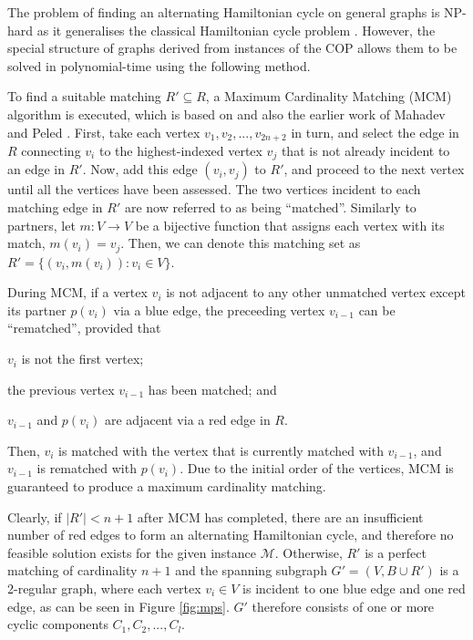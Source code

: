 \documentclass[runningheads]{llncs}
\begin{document}
The problem of finding an alternating Hamiltonian cycle on general graphs is NP-hard as it generalises the classical Hamiltonian cycle problem \cite{haggkvist1977}. However, the special structure of graphs derived from instances of the COP allows them to be solved in polynomial-time using the following method.

To find a suitable matching $R' \subseteq R$, a Maximum Cardinality Matching (MCM) algorithm is executed, which is based on \cite{becker2010} and also the earlier work of Mahadev and Peled \cite{mahadev1994}. First, take each vertex $v_1, v_2,..., v_{2n+2}$ in turn, and select the edge in $R$ connecting $v_i$ to the highest-indexed vertex $v_j$ that is not already incident to an edge in $R'$. Now, add this edge $(v_i, v_j)$ to $R'$, and proceed to the next vertex until all the vertices have been assessed. The two vertices incident to each matching edge in $R'$ are now referred to as being ``matched''. Similarly to partners, let $m : V \to V$ be a bijective function that assigns each vertex with its match, $m(v_i) = v_j$. Then, we can denote this matching set as $R' =\{(v_i, m(v_i)) : v_i \in V\}$. 

During MCM, if a vertex $v_i$ is not adjacent to any other unmatched vertex except its partner $p(v_i)$ via a blue edge, the preceeding vertex $v_{i-1}$ can be ``rematched'', provided that 
\begin{enumerate*}[label={(\alph*)}]
	\item $v_i$ is not the first vertex; 
	\item the previous vertex $v_{i-1}$ has been matched; and
	\item $v_{i-1}$ and $p(v_i)$ are adjacent via a red edge in $R$.
\end{enumerate*}
Then, $v_i$ is matched with the vertex that is currently matched with $v_{i-1}$, and $v_{i-1}$ is rematched with $p(v_i)$. Due to the initial order of the vertices, MCM is guaranteed to produce a maximum cardinality matching.

Clearly, if $|R'| < n+1$ after MCM has completed, there are an insufficient number of red edges to form an alternating Hamiltonian cycle, and therefore no feasible solution exists for the given instance $\mathcal{M}$. Otherwise, $R'$ is a perfect matching of cardinality $n+1$ and the spanning subgraph $G'=(V, B \cup R')$ is a 2-regular graph, where each vertex $v_i \in V$ is incident to one blue edge and one red edge, as can be seen in Figure \ref{fig:mps}. $G'$ therefore consists of one or more cyclic components $C_1, C_2, ..., C_l$. 
\end{document}
